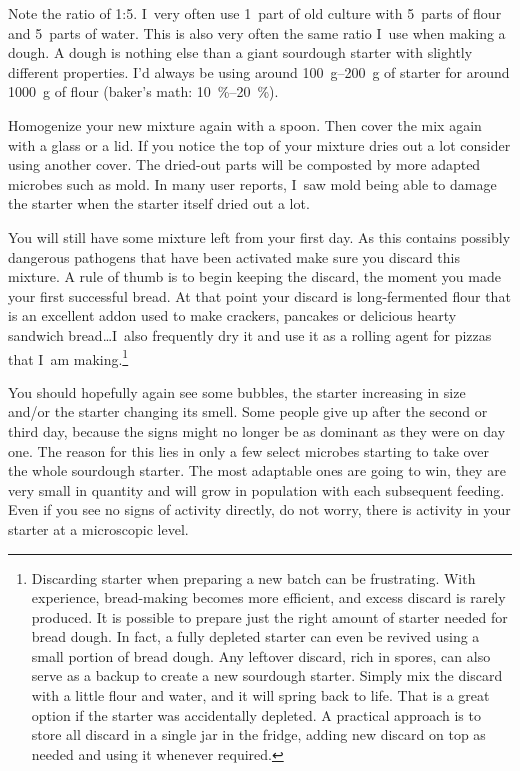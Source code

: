 Note the ratio of 1:5. I~very often use
1~part of old culture with 5~parts of flour and 5~parts of water.
This is also very often the same ratio I~use when making a dough.
A dough is nothing else than a giant sourdough starter with slightly different
properties. I'd always be using around \qtyrange{100}{200}{\gram} of starter
for around \qty{1000}{\gram} of flour (baker's math: \qtyrange{10}{20}{\percent}).

Homogenize your new mixture again with a spoon. Then cover
the mix again with a glass or a lid. If you notice the top of
your mixture dries out a lot consider using another cover. The
dried-out parts will be composted by more adapted microbes such as
mold. In many user reports, I~saw mold being able to damage
the starter when the starter itself dried out a lot. 

You will
still have some mixture left from your first day. As this contains
possibly dangerous pathogens that have been activated make sure you discard
this mixture. A rule of thumb is to begin keeping the discard,
the moment you made your first successful bread. At that point
your discard is long-fermented flour that is an excellent addon
used to make crackers, pancakes or delicious hearty sandwich
bread\ldots I~also frequently dry it and use it as a rolling agent
for pizzas that I~am making.\footnote{Discarding starter when preparing
a new batch can be frustrating. With experience, bread-making
becomes more efficient, and excess discard is rarely produced. It is
possible to prepare just the right amount of starter
needed for bread dough. In fact, a fully depleted starter can even be revived
using a small portion of bread dough. Any leftover discard, rich in spores,
can also serve as a backup to create a new sourdough starter. Simply mix the
discard with a little flour and water, and it will spring back to life. That is a
great option if the starter was accidentally depleted. A practical approach
is to store all discard in a single jar in the fridge, adding new discard on
top as needed and using it whenever required.}

You should hopefully again see some bubbles, the starter increasing
in size and/or the starter changing its smell. Some people give
up after the second or third day, because the signs might no longer
be as dominant as they were on day one. The reason for this lies in only a few
select microbes starting to take over the whole sourdough starter. The most
adaptable ones are going to win, they are very small in quantity and will
grow in population with each subsequent feeding. Even if you see no signs
of activity directly, do not worry, there is activity in
your starter at a microscopic level.

